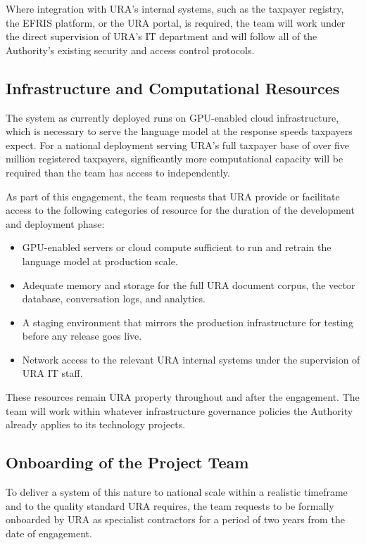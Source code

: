 \documentclass[11pt,a4paper]{article}
\begin{document}
Where integration with URA's internal systems, such as the taxpayer registry, the EFRIS platform, or the URA portal, is required, the team will work under the direct supervision of URA's IT department and will follow all of the Authority's existing security and access control protocols.

\subsection{Infrastructure and Computational Resources}

The system as currently deployed runs on GPU-enabled cloud infrastructure, which is necessary to serve the language model at the response speeds taxpayers expect. For a national deployment serving URA's full taxpayer base of over five million registered taxpayers, significantly more computational capacity will be required than the team has access to independently.

As part of this engagement, the team requests that URA provide or facilitate access to the following categories of resource for the duration of the development and deployment phase:

\begin{itemize}[topsep=0.2em, itemsep=0.2em]
  \item GPU-enabled servers or cloud compute sufficient to run and retrain the language model at production scale.
  \item Adequate memory and storage for the full URA document corpus, the vector database, conversation logs, and analytics.
  \item A staging environment that mirrors the production infrastructure for testing before any release goes live.
  \item Network access to the relevant URA internal systems under the supervision of URA IT staff.
\end{itemize}

These resources remain URA property throughout and after the engagement. The team will work within whatever infrastructure governance policies the Authority already applies to its technology projects.

\subsection{Onboarding of the Project Team}

To deliver a system of this nature to national scale within a realistic timeframe and to the quality standard URA requires, the team requests to be formally onboarded by URA as specialist contractors for a period of two years from the date of engagement.
\end{document}
